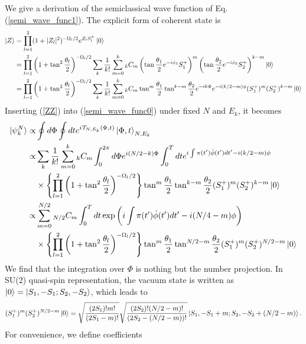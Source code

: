 \documentclass[%
superscriptaddress,
preprint,
showpacs,
nofootinbib,
amsmath,amssymb,
aps,
prc,
floatfix ]%
{revtex4-1}
\begin{document}
We give a derivation of the semiclassical wave function
of Eq. (\ref{semi_wave_func1}).
The explicit form of coherent state is
\begin{align}
  \ket{Z} &= \prod_{l=1}^2(1+|Z_l|^2)^{-\Omega_l/2}e^{Z_lS_l^{+}}\ket{0} \nonumber \\
  &= \prod_{l=1}^2\left(1+\tan^2{\frac{\theta_l}{2}}\right)^{-\Omega_l/2} \sum_k \frac{1}{k!} \sum_{m=0}^k
  {}_kC_m \left(
  \tan{\frac{\theta_1}{2}}e^{-i\phi_1}S_1^{+} \right)^m \left(
  \tan{\frac{\theta_2}{2}}e^{-i\phi_2}S_2^{+} \right)^{k-m} \ket{0} \nonumber \\
  &= \prod_{l=1}^2\left(1+\tan^2{\frac{\theta_l}{2}}\right)^{-\Omega_l/2} \sum_k \frac{1}{k!} \sum_{m=0}^k
  {}_kC_m \tan^m{\frac{\theta_1}{2}}\tan^{k-m}{\frac{\theta_2}{2}}e^{-ik\Phi}e^{-i(k/2-m)\phi}
  (S_1^{+})^m(S_2^{+})^{k-m} \ket{0}
  \label{ZZ}
\end{align} 
Inserting (\ref{ZZ}) into (\ref{semi_wave_func0}) under fixed $N$ and $E_k$,
it becomes
\begin{align}
	\ket{\psi_k^N} \propto& \oint d\Phi \oint dt
	e^{i\mathcal{T}_{N,E_k}(\Phi, t)}
	\ket{\Phi,t}_{N,E_k} \nonumber \\
  \propto& \sum_k \frac{1}{k!} \sum_{m=0}^k{}_kC_m \int_0^{2\pi} d\Phi e^{i(N/2-k)\Phi} 
  \int_0^T dt e^{i\int \pi(t') \dot{\phi}(t') dt'-i(k/2-m)\phi} \nonumber \\
  &\times \left\{ \prod_{l=1}^2\left(1+\tan^2{\frac{\theta_l}{2}}\right)^{-\Omega_l/2} \right\}
\tan^m{\frac{\theta_1}{2}}\tan^{k-m}\frac{\theta_2}{2}(S_1^{+})^m(S_2^{+})^{k-m} \ket{0} \nonumber \\
  \propto& \sum_{m=0}^{N/2}{}_{N/2}C_m  \int_0^T dt \exp{\left( i\int \pi(t') \dot{\phi}(t') dt'-i(N/4-m)\phi \right)} \nonumber \\
  &\times \left\{ \prod_{l=1}^2\left(1+\tan^2{\frac{\theta_l}{2}}\right)^{-\Omega_l/2} \right\} 
\tan^m{\frac{\theta_1}{2}}\tan^{N/2-m}\frac{\theta_2}{2} (S_1^{+})^m(S_2^{+})^{N/2-m} \ket{0} \label{semi_wave_func_b}
\end{align}
We find that the integration over $\Phi$ is nothing but the number projection.
In SU(2) quasi-spin representation, the vacuum state is written as
$\ket{0}=\ket{S_1,-S_1;S_2,-S_2}$, which leads to
\begin{align}
  (S_1^{+})^m(S_2^{+})^{N/2-m} \ket{0} 
  = \sqrt{\frac{(2S_1)!m!}{(2S_1-m)!}} \sqrt{\frac{(2S_2)!(N/2-m)!}{(2S_2-(N/2-m))!}}
  \ket{S_1,-S_1+m;S_2,-S_2+(N/2-m)}.
\end{align}
For convenience, we define coefficients
\end{document}
